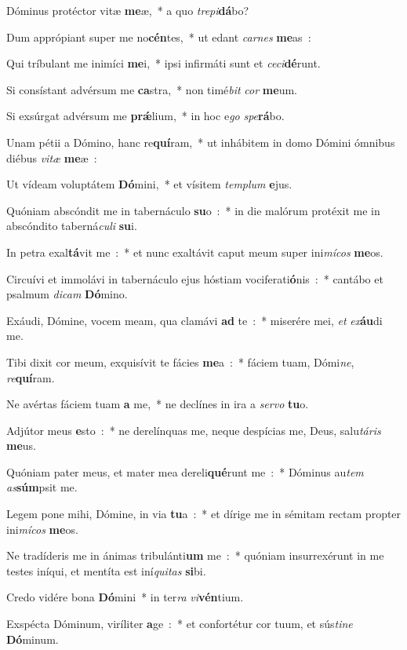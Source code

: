 ﻿\item Dóminus protéctor vitæ \textbf{me}æ,~* a quo \emph{tre}\emph{pi}\textbf{dá}bo?
\item Dum apprópiant super me no\textbf{cén}tes,~* ut edant \emph{car}\emph{nes} \textbf{me}as~:
\item Qui tríbulant me inimíci \textbf{me}i,~* ipsi infirmáti sunt et \emph{ce}\emph{ci}\textbf{dé}runt.
\item Si consístant advérsum me \textbf{ca}stra,~* non timé\emph{bit} \emph{cor} \textbf{me}um.
\item Si exsúrgat advérsum me \textbf{prǽ}lium,~* in hoc e\emph{go} \emph{spe}\textbf{rá}bo.
\item Unam pétii a Dómino, hanc re\textbf{quí}ram,~* ut inhábitem in domo Dómini ómnibus diébus \emph{vi}\emph{tæ} \textbf{me}æ~:
\item Ut vídeam voluptátem \textbf{Dó}mini,~* et vísitem \emph{tem}\emph{plum} \textbf{e}jus.
\item Quóniam abscóndit me in tabernáculo \textbf{su}o~:~* in die malórum protéxit me in abscóndito taberná\emph{cu}\emph{li} \textbf{su}i.
\item In petra exal\textbf{tá}vit me~:~* et nunc exaltávit caput meum super ini\emph{mí}\emph{cos} \textbf{me}os.
\item Circuívi et immolávi in tabernáculo ejus hóstiam vociferati\textbf{ó}nis~:~* cantábo et psalmum \emph{di}\emph{cam} \textbf{Dó}mino.
\item Exáudi, Dómine, vocem meam, qua clamávi \textbf{ad} te~:~* miserére mei, \emph{et} \emph{ex}\textbf{áu}di me.
\item Tibi dixit cor meum, exquisívit te fácies \textbf{me}a~:~* fáciem tuam, Dómi\emph{ne}, \emph{re}\textbf{quí}ram.
\item Ne avértas fáciem tuam \textbf{a} me,~* ne declínes in ira a \emph{ser}\emph{vo} \textbf{tu}o.
\item Adjútor meus \textbf{e}sto~:~* ne derelínquas me, neque despícias me, Deus, salu\emph{tá}\emph{ris} \textbf{me}us.
\item Quóniam pater meus, et mater mea dereli\textbf{qué}runt me~:~* Dóminus au\emph{tem} \emph{as}\textbf{súm}psit me.
\item Legem pone mihi, Dómine, in via \textbf{tu}a~:~* et dírige me in sémitam rectam propter ini\emph{mí}\emph{cos} \textbf{me}os.
\item Ne tradíderis me in ánimas tribulánti\textbf{um} me~:~* quóniam insurrexérunt in me testes iníqui, et mentíta est iní\emph{qui}\emph{tas} \textbf{si}bi.
\item Credo vidére bona \textbf{Dó}mini~* in ter\emph{ra} \emph{vi}\textbf{vén}tium.
\item Exspécta Dóminum, viríliter \textbf{a}ge~:~* et confortétur cor tuum, et sús\emph{ti}\emph{ne} \textbf{Dó}minum.